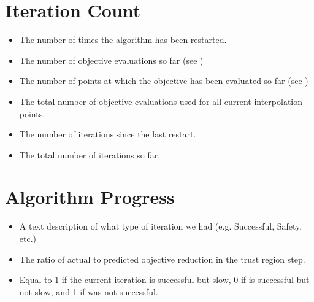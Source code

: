 \documentclass[letterpaper,10pt,english]{sphinxmanual}
\begin{document}
\section{Iteration Count}
\label{\detokenize{diagnostic:iteration-count}}\begin{itemize}
\item {} 
 \sphinxhyphen{} The number of times the algorithm has been restarted.

\item {} 
 \sphinxhyphen{} The number of objective evaluations so far (see )

\item {} 
 \sphinxhyphen{} The number of points at which the objective has been evaluated so far (see )

\item {} 
 \sphinxhyphen{} The total number of objective evaluations used for all current interpolation points.

\item {} 
 \sphinxhyphen{} The number of iterations since the last restart.

\item {} 
 \sphinxhyphen{} The total number of iterations so far.

\end{itemize}


\section{Algorithm Progress}
\label{\detokenize{diagnostic:algorithm-progress}}\begin{itemize}
\item {} 
 \sphinxhyphen{} A text description of what type of iteration we had (e.g. Successful, Safety, etc.)

\item {} 
 \sphinxhyphen{} The ratio of actual to predicted objective reduction in the trust region step.

\item {} 
 \sphinxhyphen{} Equal to 1 if the current iteration is successful but slow, 0 if is successful but not slow, and \sphinxhyphen{}1 if was not successful.

\end{itemize}
\end{document}
